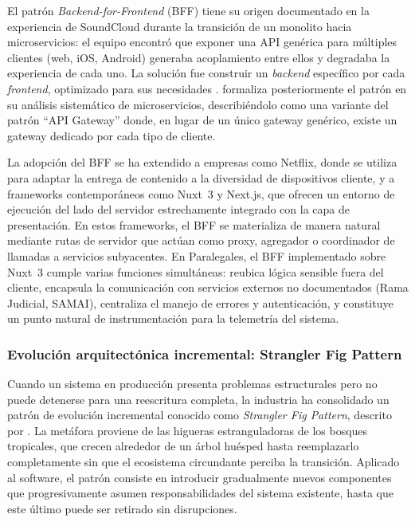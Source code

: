 El patrón \textit{Backend-for-Frontend} (BFF) tiene su origen documentado en la experiencia de SoundCloud durante la transición de un monolito hacia microservicios: el equipo encontró que exponer una API genérica para múltiples clientes (web, iOS, Android) generaba acoplamiento entre ellos y degradaba la experiencia de cada uno. La solución fue construir un \textit{backend} específico por cada \textit{frontend}, optimizado para sus necesidades \cite{NewmanBFF}. \textcite{Newman2021} formaliza posteriormente el patrón en su análisis sistemático de microservicios, describiéndolo como una variante del patrón ``API Gateway'' donde, en lugar de un único gateway genérico, existe un gateway dedicado por cada tipo de cliente.

La adopción del BFF se ha extendido a empresas como Netflix, donde se utiliza para adaptar la entrega de contenido a la diversidad de dispositivos cliente, y a frameworks contemporáneos como Nuxt~3 y Next.js, que ofrecen un entorno de ejecución del lado del servidor estrechamente integrado con la capa de presentación. En estos frameworks, el BFF se materializa de manera natural mediante rutas de servidor que actúan como proxy, agregador o coordinador de llamadas a servicios subyacentes. En Paralegales, el BFF implementado sobre Nuxt~3 cumple varias funciones simultáneas: reubica lógica sensible fuera del cliente, encapsula la comunicación con servicios externos no documentados (Rama Judicial, SAMAI), centraliza el manejo de errores y autenticación, y constituye un punto natural de instrumentación para la telemetría del sistema.

\subsubsection{Evolución arquitectónica incremental: Strangler Fig Pattern}

Cuando un sistema en producción presenta problemas estructurales pero no puede detenerse para una reescritura completa, la industria ha consolidado un patrón de evolución incremental conocido como \textit{Strangler Fig Pattern}, descrito por \textcite{Fowler2004Strangler}. La metáfora proviene de las higueras estranguladoras de los bosques tropicales, que crecen alrededor de un árbol huésped hasta reemplazarlo completamente sin que el ecosistema circundante perciba la transición. Aplicado al software, el patrón consiste en introducir gradualmente nuevos componentes que progresivamente asumen responsabilidades del sistema existente, hasta que este último puede ser retirado sin disrupciones.

